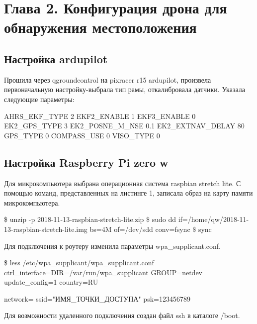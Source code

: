\section{Глава 2. Конфигурация дрона для обнаружения местоположения}


\subsection{Настройка ardupilot}
Прошила через qgroundcontrol на pixracer r15 ardupilot, произвела первоначальную настройку-выбрала тип рамы, откалибровала датчики.
Указала следующие параметры:
\begin{MyCode}
AHRS_EKF_TYPE 2
EKF2_ENABLE 1
EKF3_ENABLE 0
EK2_GPS_TYPE 3
EK2_POSNE_M_NSE 0.1
EK2_EXTNAV_DELAY 80
GPS_TYPE 0
COMPASS_USE 0
VISO_TYPE 0
\end{MyCode}

\subsection{Настройка Raspberry Pi zero w}

Для микрокомпьютера выбрана операционная система raspbian stretch lite.
С помощью команд, представленных на листинге 1, записала образ на карту памяти микрокомпьютера.
\begin{MyCode}
\$ unzip -p 2018-11-13-raspbian-stretch-lite.zip
\$ sudo dd if=/home/qw/2018-11-13-raspbian-stretch-lite.img bs=4M of=/dev/sdd conv=fsync
\$ sync
\end{MyCode}
Для подключения к роутеру изменила параметры wpa_supplicant.conf.
\begin{MyCode}
\$ less /etc/wpa_supplicant/wpa_supplicant.conf
ctrl_interface=DIR=/var/run/wpa_supplicant GROUP=netdev
update_config=1
country=RU

network={
	ssid="ИМЯ_ТОЧКИ_ДОСТУПА"
	psk=123456789
}
\end{MyCode}
Для возможности удаленного подключения создан файл ssh в каталоге /boot.

